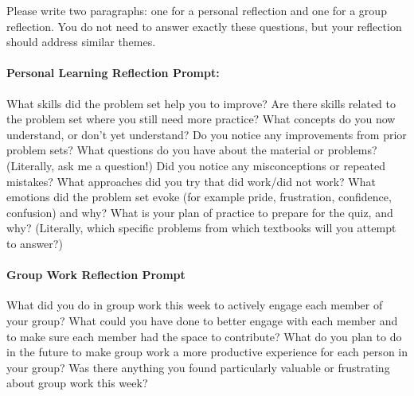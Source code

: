 \documentclass[12pt]{article}
\begin{document}

{}%




\vspace{1cm}
Please write two paragraphs: one for a personal reflection and one for a group reflection. You do not need to answer exactly these questions, but your reflection should address similar themes.

\paragraph{Personal Learning Reflection Prompt:}
What skills did the problem set help you to improve? Are there skills related to the problem set where you still need more practice? What concepts do you now understand, or don't yet understand? Do you notice any improvements from prior problem sets? What questions do you have about the material or problems? (Literally, ask me a question!) Did you notice any misconceptions or repeated mistakes? What approaches did you try that did work/did not work? What emotions did the problem set evoke (for example pride, frustration, confidence, confusion) and why? What is your plan of practice to prepare for the quiz, and why? (Literally, which specific problems from which textbooks will you attempt to answer?) 

\paragraph{Group Work Reflection Prompt} What did you do in group work this week to actively engage each member of your group? What could you have done to better engage with each member and to make sure each member had the space to contribute? What do you plan to do in the future to make group work a more productive experience for each person in your group? Was there anything you found particularly valuable or frustrating about group work this week?
\end{document}
